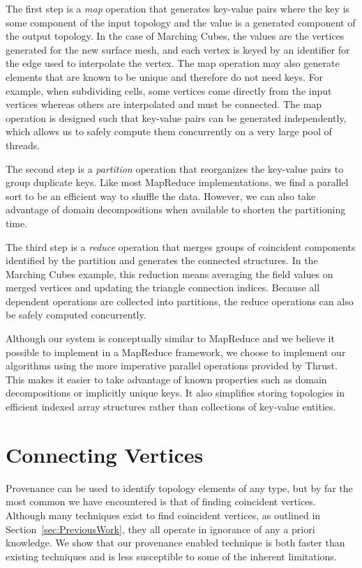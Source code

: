 \documentclass[10pt,journal,cspaper,compsoc]{IEEEtran}
\begin{document}
The first step is a \emph{map} operation that generates key-value pairs
where the key is some component of the input topology and the value is a
generated component of the output topology.  In the case of Marching Cubes,
the values are the vertices generated for the new surface mesh, and each
vertex is keyed by an identifier for the edge used to interpolate the
vertex.  The map operation may also generate elements that are known to be
unique and therefore do not need keys.  For example, when subdividing
cells, some vertices come directly from the input vertices whereas others
are interpolated and must be connected.  The map operation is designed such that
key-value pairs can be generated independently, which allows us to safely
compute them concurrently on a very large pool of threads.

The second step is a \emph{partition} operation that reorganizes the
key-value pairs to group duplicate keys.  Like most MapReduce
implementations, we find a parallel sort to be an efficient way to shuffle
the data.  However, we can also take advantage of domain decompositions
when available to shorten the partitioning time.

The third step is a \emph{reduce} operation that merges groups of
coincident components identified by the partition and generates the
connected structures.  In the Marching Cubes example, this reduction means
averaging the field values on merged vertices and updating the triangle
connection indices.  Because all dependent operations are collected into
partitions, the reduce operations can also be safely computed
concurrently.

Although our system is conceptually similar to MapReduce and we believe it
possible to implement in a MapReduce framework, we choose to implement our
algorithms using the more imperative parallel operations provided by
Thrust.  This makes it easier to take advantage of known properties such as
domain decompositions or implicitly unique keys.  It also simplifies
storing topologies in efficient indexed array structures rather than
collections of key-value entities.

\section{Connecting Vertices}
\label{sec:ConnectingVertices}

Provenance can be used to identify topology elements of any type, but by
far the most common we have encountered is that of finding coincident
vertices.  Although many techniques exist to find coincident vertices, as
outlined in Section~\ref{sec:PreviousWork}, they all operate in ignorance
of any a priori knowledge.  We show that our provenance enabled technique
is both faster than existing techniques and is less susceptible to some of
the inherent limitations.
\end{document}
